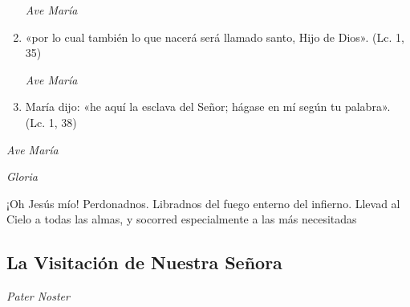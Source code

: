\documentclass[a4paper,11pt, oneside]{report}
\begin{document}
\begin{enumerate}
          \textit{Ave María}

          \item «por lo cual también lo que nacerá será llamado santo, Hijo de Dios». (Lc. 1, 35)

          \textit{Ave María}

          \item María dijo: «he aquí la esclava del Señor; hágase en mí según tu palabra». (Lc. 1, 38)
          
        \end{enumerate}

        \textit{Ave María} \par
        \indent\textit{Gloria} \par
        \indent¡Oh Jesús mío! Perdonadnos. Libradnos del fuego enterno del infierno. Llevad al Cielo a todas las almas, y socorred especialmente a las más 
        necesitadas
            
      \subsection*{La Visitación de Nuestra Señora}
      
        \textit{Pater Noster} 
\end{document}
